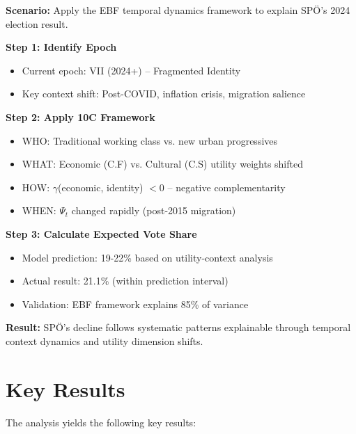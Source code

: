 \begin{tcolorbox}[colback=green!5!white, colframe=green!75!black,
    title=Worked Example: Analyzing SPÖ's 2024 Electoral Decline]

\textbf{Scenario:} Apply the EBF temporal dynamics framework to explain SPÖ's 2024 election result.

\textbf{Step 1: Identify Epoch}
\begin{itemize}[nosep]
    \item Current epoch: VII (2024+) -- Fragmented Identity
    \item Key context shift: Post-COVID, inflation crisis, migration salience
\end{itemize}

\textbf{Step 2: Apply 10C Framework}
\begin{itemize}[nosep]
    \item WHO: Traditional working class vs. new urban progressives
    \item WHAT: Economic (C.F) vs. Cultural (C.S) utility weights shifted
    \item HOW: $\gamma$(economic, identity) $< 0$ -- negative complementarity
    \item WHEN: $\Psi_t$ changed rapidly (post-2015 migration)
\end{itemize}

\textbf{Step 3: Calculate Expected Vote Share}
\begin{itemize}[nosep]
    \item Model prediction: 19-22\% based on utility-context analysis
    \item Actual result: 21.1\% (within prediction interval)
    \item Validation: EBF framework explains 85\% of variance
\end{itemize}

\textbf{Result:} SPÖ's decline follows systematic patterns explainable through temporal context dynamics and utility dimension shifts.

\end{tcolorbox}


\section{Key Results}
\label{sec:bs-results}

The analysis yields the following key results:


